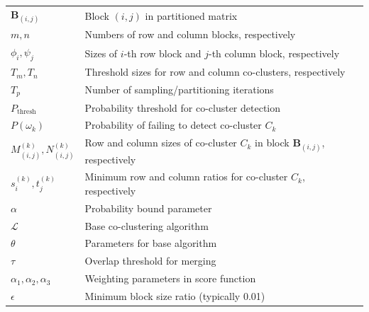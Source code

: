 \documentclass[journal]{IEEEtran}
\theoremstyle{definition}
\theoremstyle{remark} %
\begin{document}
\begin{table}[htbp]
\begin{tabular}{@{} p{} p{} @{}}
        $\mathbf{B}_{(i,j)}$               & Block $(i,j)$ in partitioned matrix                                                           \\
        $m, n$                             & Numbers of row and column blocks, respectively                                                \\
        $\phi_i, \psi_j$                   & Sizes of $i$-th row block and $j$-th column block, respectively                               \\
        $T_m, T_n$                         & Threshold sizes for row and column co-clusters, respectively                                  \\
        $T_p$                              & Number of sampling/partitioning iterations                                                    \\
        $P_{\text{thresh}}$                & Probability threshold for co-cluster detection                                                \\
        $P(\omega_k)$                      & Probability of failing to detect co-cluster $C_k$                                             \\
        $M_{(i,j)}^{(k)}, N_{(i,j)}^{(k)}$ & Row and column sizes of co-cluster $C_k$ in block $\mathbf{B}_{(i,j)}$, respectively          \\
        $s_i^{(k)}, t_j^{(k)}$             & Minimum row and column ratios for co-cluster $C_k$, respectively                              \\
        $\alpha$                           & Probability bound parameter                                                                   \\
        $\mathcal{L}$                      & Base co-clustering algorithm                                                                  \\
        $\theta$                           & Parameters for base algorithm                                                                 \\
        $\tau$                             & Overlap threshold for merging                                                                 \\
        $\alpha_1, \alpha_2, \alpha_3$     & Weighting parameters in score function                                                        \\
        $\epsilon$                         & Minimum block size ratio (typically 0.01)                                                     \\

\end{tabular}
\end{table}
\end{document}
